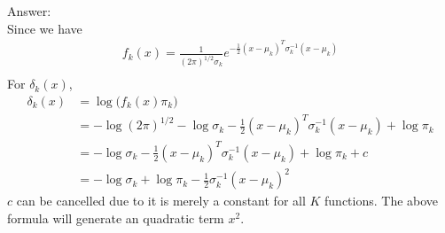 \documentclass[12pt,a4paper]{article}%
\theoremstyle{definition}
\theoremstyle{plain}
\numberwithin{equation}{section}
\begin{document}
\begin{oframed}
Answer: ~\\
Since we have
\begin{gather*}
f_{k}(x) = \frac{1}{(2 \pi)^{1/2}\sigma_{k}} e^{-\frac{1}{2}(x-\mu_{k})^{T}\sigma_{k}^{-1}(x-\mu_{k})} \\
\end{gather*}
For $\delta_{k}(x)$,
\begin{align*}
\delta_{k}(x) &= \log \big( f_{k}(x)\pi_{k} \big) \\
 &= -\log (2\pi)^{1/2} - \log \sigma_{k}-\frac{1}{2}(x-\mu_{k})^{T}{\sigma}_{k}^{-1}(x-\mu_{k}) + \log \pi_{k} \\
 &= - \log \sigma_{k}-\frac{1}{2}(x-\mu_{k})^{T}\sigma_{k}^{-1}(x-\mu_{k}) + \log \pi_{k} + c \\
 &= - \log \sigma_{k} + \log \pi_{k} -\frac{1}{2}\sigma_{k}^{-1}(x-\mu_{k})^{2}
\end{align*}
$c$ can be cancelled due to it is merely a constant for all $K$ functions. 
The above formula will generate an quadratic term $x^{2}$.
\end{oframed}
\end{document}
